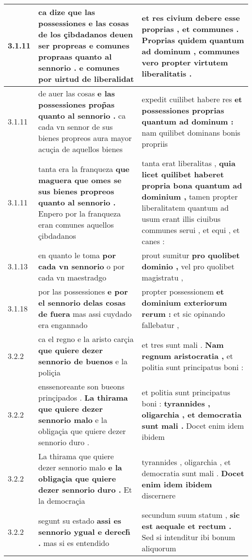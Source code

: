 \begin{tabular}{|p{1cm}|p{6.5cm}|p{6.5cm}|}
3.1.11 & ca dize que las possessiones e las cosas de los çibdadanos deuen ser propreas \textbf{ e comunes propraas quanto al sennorio . } e comunes por uirtud de liberalidat & et res civium debere esse proprias , et communes . \textbf{ Proprias quidem quantum ad dominum , communes vero } propter virtutem liberalitatis . \\\hline
3.1.11 & de auer las cosas \textbf{ e las possessiones prop̃as quanto al sennorio . } ca cada vn sennor de sus bienes propreos aura mayor acuçia de aquellos bienes & expedit cuilibet habere res \textbf{ et possessiones proprias quantum ad dominum : } nam quilibet dominans bonis propriis \\\hline
3.1.11 & tanta era la franqueza \textbf{ que maguera que omes se sus bienes propreos quanto al sennorio . } Enpero por la franqueza eran comunes aquellos çibdadanos & tanta erat liberalitas , \textbf{ quia licet quilibet haberet propria bona quantum ad dominium , } tamen propter liberalitatem quantum ad usum erant illis ciuibus communes serui , et equi , et canes : \\\hline
3.1.13 & en quanto le toma \textbf{ por cada vn sennorio } o por cada vn maestradgo & prout sumitur \textbf{ pro quolibet dominio , } vel pro quolibet magistratu , \\\hline
3.1.18 & por las possessiones \textbf{ e por el sennorio delas cosas de fuera } mas assi cuydado era engannado & propter possessionem \textbf{ et dominium exteriorum rerum : } et sic opinando fallebatur , \\\hline
3.2.2 & ca el regno e la aristo carçia \textbf{ que quiere dezer sennorio de buenos } e la poliçia & et tres sunt mali . \textbf{ Nam regnum aristocratia , } et politia sunt principatus boni : \\\hline
3.2.2 & enssenoreante son bueons prinçipados . \textbf{ La thirama que quiere dezer sennorio malo } e la obligaçia que quiere dezer sennorio duro . & et politia sunt principatus boni : \textbf{ tyrannides , oligarchia , et democratia sunt mali . } Docet enim idem ibidem \\\hline
3.2.2 & La thirama que quiere dezer sennorio malo \textbf{ e la obligaçia que quiere dezer sennorio duro . } Et la democraçia & tyrannides , oligarchia , et democratia sunt mali . \textbf{ Docet enim idem ibidem } discernere \\\hline
3.2.2 & segunt su estado \textbf{ assi es sennorio ygual e derech̃ . } mas si es entendido & secundum suum statum , \textbf{ sic est aequale et rectum . } Sed si intenditur ibi bonum aliquorum \\\hline

\end{tabular}
